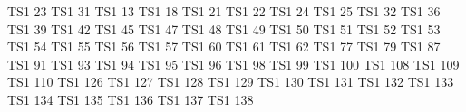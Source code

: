 

\exchardef  \excapitalcompwordmark   TS1   23
\exchardef  \exascendercompwordmark  TS1   31
\exchardef  \exquotestraightbase     TS1   13
\exchardef  \exquotestraightdblbase  TS1   18
\exchardef  \extwelveudash           TS1   21
\exchardef  \exthreequartersemdash   TS1   22
\exchardef  \exleftarrow             TS1   24
\exchardef  \exrightarrow            TS1   25
\exchardef  \exblank                 TS1   32
\exchardef  \exdollar                TS1   36
\exchardef  \exquotesingle           TS1   39
\exchardef  \exasteriskcentered      TS1   42
\exchardef  \exdblhyphen             TS1   45
\exchardef  \exfractionsolidus       TS1   47
\exchardef  \exzerooldstyle          TS1   48
\exchardef  \exoneoldstyle           TS1   49
\exchardef  \extwooldstyle           TS1   50
\exchardef  \exthreeoldstyle         TS1   51
\exchardef  \exfouroldstyle          TS1   52
\exchardef  \exfiveoldstyle          TS1   53
\exchardef  \exsixoldstyle           TS1   54
\exchardef  \exsevenoldstyle         TS1   55
\exchardef  \exeightoldstyle         TS1   56
\exchardef  \exnineoldstyle          TS1   57
\exchardef  \exlangle                TS1   60
\exchardef  \exminus                 TS1   61
\exchardef  \exrangle                TS1   62
\exchardef  \exmho                   TS1   77
\exchardef  \exbigcircle             TS1   79
\exchardef  \exohm                   TS1   87
\exchardef  \exlbrackdbl             TS1   91
\exchardef  \exrbrackdbl             TS1   93
\exchardef  \exuparrow               TS1   94
\exchardef  \exdownarrow             TS1   95
\exchardef  \exasciigrave            TS1   96
\exchardef  \exborn                  TS1   98
\exchardef  \exdivorced              TS1   99
\exchardef  \exdied                  TS1  100
\exchardef  \exleaf                  TS1  108
\exchardef  \exmarried               TS1  109
\exchardef  \exmusicalnote           TS1  110
\exchardef  \extildelow              TS1  126
\exchardef  \exdblhyphenchar         TS1  127
\exchardef  \exasciibreve            TS1  128
\exchardef  \exasciicaron            TS1  129
\exchardef  \exacutedbl              TS1  130
\exchardef  \exgravedbl              TS1  131
\exchardef  \exdagger                TS1  132
\exchardef  \exdaggerdbl             TS1  133
\exchardef  \exbardbl                TS1  134
\exchardef  \experthousand           TS1  135
\exchardef  \exbullet                TS1  136
\exchardef  \excelsius               TS1  137
\exchardef  \exdollaroldstyle        TS1  138
